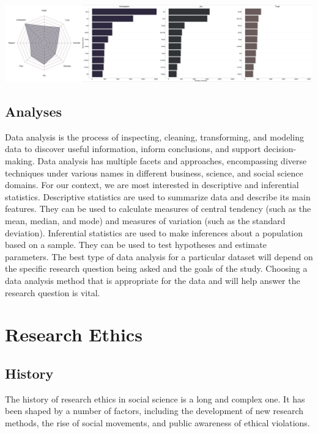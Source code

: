 \documentclass[
  b5paper]{book}
\begin{document}
\includegraphics[width=1\textwidth,height=\textheight]{images/VR-Play-Emotion-MP.png}

\hypertarget{analyses}{%
\section*{Analyses}\label{analyses}}

Data analysis is the process of inspecting, cleaning, transforming, and modeling data to discover useful information, inform conclusions, and support decision-making. Data analysis has multiple facets and approaches, encompassing diverse techniques under various names in different business, science, and social science domains. For our context, we are most interested in descriptive and inferential statistics. Descriptive statistics are used to summarize data and describe its main features. They can be used to calculate measures of central tendency (such as the mean, median, and mode) and measures of variation (such as the standard deviation). Inferential statistics are used to make inferences about a population based on a sample. They can be used to test hypotheses and estimate parameters. The best type of data analysis for a particular dataset will depend on the specific research question being asked and the goals of the study. Choosing a data analysis method that is appropriate for the data and will help answer the research question is vital.

\hypertarget{research-ethics-1}{%
\chapter{Research Ethics}\label{research-ethics-1}}

\hypertarget{history}{%
\section{History}\label{history}}

The history of research ethics in social science is a long and complex one. It has been shaped by a number of factors, including the development of new research methods, the rise of social movements, and public awareness of ethical violations.
\end{document}
